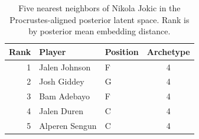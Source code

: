 \begin{table}[htbp]
  \centering\small
  \begin{tabular}{rllc}
    \toprule
    Rank & Player & Position & Archetype \\
    \midrule
    1 & Jalen Johnson & F & 4 \\
    2 & Josh Giddey & G & 4 \\
    3 & Bam Adebayo & F & 4 \\
    4 & Jalen Duren & C & 4 \\
    5 & Alperen Sengun & C & 4 \\
    \bottomrule
  \end{tabular}
  \caption{Five nearest neighbors of Nikola Jokic in the Procrustes-aligned posterior latent space. Rank is by posterior mean embedding distance.}
  \label{tab:Nikola_Jokic_neighbors}
\end{table}

